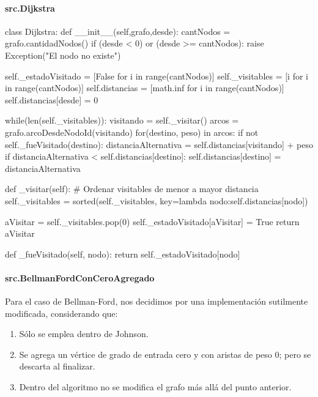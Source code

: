 \documentclass[../tp2_grupo404.tex]{subfiles}
\begin{document}
\paragraph{src.Dijkstra}

\begin{alternate}[breaklines=true,numbers=left,xleftmargin=5mm]
    class Dijkstra:
    def __init__(self,grafo,desde):
        cantNodos = grafo.cantidadNodos()
        if (desde < 0) or (desde >= cantNodos):
            raise Exception("El nodo no existe")
        
        self._estadoVisitado = [False    for i in range(cantNodos)]
        self._visitables     = [i        for i in range(cantNodos)]
        self.distancias      = [math.inf for i in range(cantNodos)]
        self.distancias[desde] = 0
        
        while(len(self._visitables)):
            visitando = self._visitar()
            arcos = grafo.arcoDesdeNodoId(visitando)
            for(destino, peso) in arcos:
                if not self._fueVisitado(destino):
                    distanciaAlternativa = self.distancias[visitando] + peso
                    if distanciaAlternativa < self.distancias[destino]:
                        self.distancias[destino] = distanciaAlternativa

    def _visitar(self):
        # Ordenar visitables de menor a mayor distancia
        self._visitables = sorted(self._visitables, key=lambda nodo:self.distancias[nodo])

        aVisitar = self._visitables.pop(0)
        self._estadoVisitado[aVisitar] = True
        return aVisitar

    def _fueVisitado(self, nodo):
        return self._estadoVisitado[nodo]
\end{alternate}

\paragraph{src.BellmanFordConCeroAgregado}

Para el caso de Bellman-Ford, nos decidimos por una implementación sutilmente modificada, considerando que:
\begin{enumerate}
    \item Sólo se emplea dentro de Johnson.
    \item Se agrega un vértice de grado de entrada cero y con aristas de peso 0; pero se descarta al finalizar.
    \item Dentro del algoritmo no se modifica el grafo más allá del punto anterior.
\end{enumerate}
\end{document}
